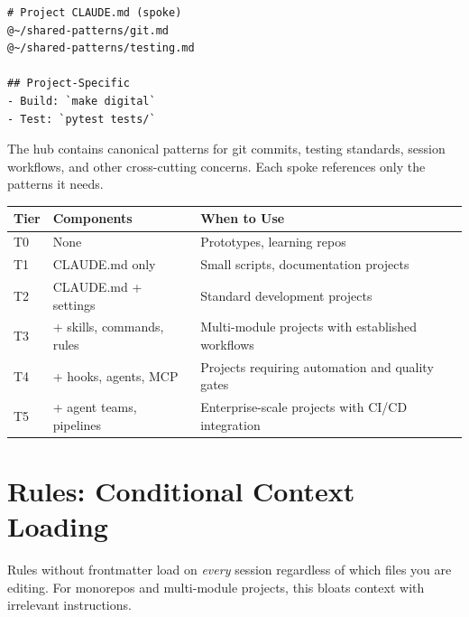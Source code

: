 \begin{verbatim}
# Project CLAUDE.md (spoke)
@~/shared-patterns/git.md
@~/shared-patterns/testing.md

## Project-Specific
- Build: `make digital`
- Test: `pytest tests/`
\end{verbatim}

The hub contains canonical patterns for git commits, testing standards, session workflows,
and other cross-cutting concerns. Each spoke references only the patterns it needs.


\begin{fullwidth}
\begin{tabular}{@{}llp{8cm}@{}}
\toprule
\textbf{Tier} & \textbf{Components} & \textbf{When to Use} \\
\midrule
T0 & None & Prototypes, learning repos \\
T1 & CLAUDE.md only & Small scripts, documentation projects \\
T2 & CLAUDE.md + settings & Standard development projects \\
T3 & + skills, commands, rules & Multi-module projects with established workflows \\
T4 & + hooks, agents, MCP & Projects requiring automation and quality gates \\
T5 & + agent teams, pipelines & Enterprise-scale projects with CI/CD integration \\
\bottomrule
\end{tabular}
\end{fullwidth}


\section{Rules: Conditional Context Loading}
\label{sec:rules}


Rules without  frontmatter load on \emph{every} session regardless of
which files you are editing. For monorepos and multi-module projects,
this bloats context with irrelevant instructions.

